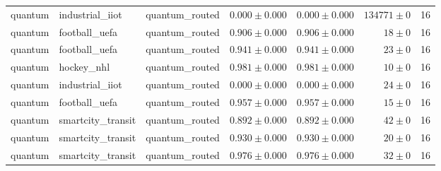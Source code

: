 \begin{table}[htbp]
\begin{tabular}{l l l r r r r}
quantum & industrial\_iiot & quantum\_routed & $0.000\pm0.000$ & $0.000\pm0.000$ & $134771\pm0$ & 16 \\
quantum & football\_uefa & quantum\_routed & $0.906\pm0.000$ & $0.906\pm0.000$ & $18\pm0$ & 16 \\
quantum & football\_uefa & quantum\_routed & $0.941\pm0.000$ & $0.941\pm0.000$ & $23\pm0$ & 16 \\
quantum & hockey\_nhl & quantum\_routed & $0.981\pm0.000$ & $0.981\pm0.000$ & $10\pm0$ & 16 \\
quantum & industrial\_iiot & quantum\_routed & $0.000\pm0.000$ & $0.000\pm0.000$ & $24\pm0$ & 16 \\
quantum & football\_uefa & quantum\_routed & $0.957\pm0.000$ & $0.957\pm0.000$ & $15\pm0$ & 16 \\
quantum & smartcity\_transit & quantum\_routed & $0.892\pm0.000$ & $0.892\pm0.000$ & $42\pm0$ & 16 \\
quantum & smartcity\_transit & quantum\_routed & $0.930\pm0.000$ & $0.930\pm0.000$ & $20\pm0$ & 16 \\
quantum & smartcity\_transit & quantum\_routed & $0.976\pm0.000$ & $0.976\pm0.000$ & $32\pm0$ & 16 \\
\hline
\end{tabular}
\end{table}
